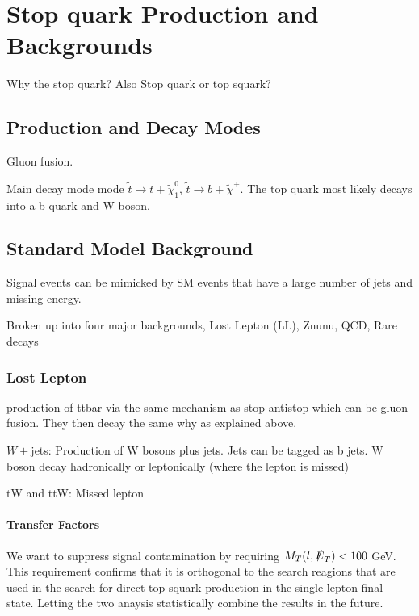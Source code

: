 \chapter{Stop quark Production and Backgrounds}
\label{ch:Search}

Why the stop quark? Also Stop quark or top squark?

\section{Production and Decay Modes}
\label{sec:Production}

Gluon fusion.

Main decay mode mode $\tilde{t}\rightarrow t+\tilde{\chi}^{0}_{1}$, $\tilde{t}\rightarrow b+\tilde{\chi}^{+}$. The top quark most likely decays into a b quark and W boson. 

\section{Standard Model Background}
\label{sec:SMBackground}

Signal events can be mimicked by SM events that have a large number of jets and missing energy. 

Broken up into four major backgrounds, Lost Lepton (LL), Znunu, QCD, Rare decays

\subsection{Lost Lepton}
\label{subsec:LL}

\ttbar{} production of ttbar via the same mechanism as stop-antistop which can be gluon fusion. They then decay the same why as explained above.

$W+$jets: Production of W bosons plus jets. Jets can be tagged as b jets. W boson decay hadronically or leptonically (where the lepton is missed)

tW and ttW: Missed lepton

\subsubsection{Transfer Factors}
\label{subsec:TF}

We want to suppress signal contamination by requiring $M_{T}(l, \slashed{E}_{T}) < 100$ GeV. This requirement confirms that it is orthogonal to the search reagions that are used in the search for direct top squark production in the single-lepton final state. Letting the two anaysis statistically combine the results in the future. 

